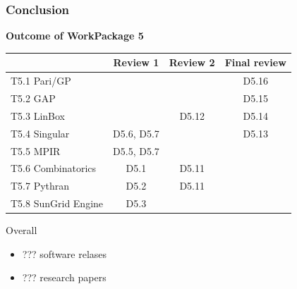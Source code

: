\documentclass{beamer}
\begin{document}

    


\begin{frame}
  \frametitle{Conclusion}

  \textbf{Outcome of WorkPackage 5}
  \begin{center}
{\small
    \begin{tabular}{lccc}
    \toprule
        & Review 1 & Review 2 & Final review\\
    \midrule
    T5.1 Pari/GP & & & {\color{darkgreen} D5.16} \\
    T5.2 GAP     & & & {\color{darkgreen} D5.15} \\
    T5.3 LinBox  & & {D5.12} & {\color{darkgreen} D5.14} \\
    T5.4 Singular& D5.6, D5.7 & & {\color{darkgreen} D5.13} \\
    T5.5 MPIR    & D5.5, D5.7& & \\
    T5.6 Combinatorics  & D5.1& {D5.11} & \\
    T5.7 Pythran        & D5.2 & {D5.11} & \\
    T5.8 SunGrid Engine & D5.3 & & \\
    \bottomrule
    
  \end{tabular}
}
  \end{center}
  
  Overall
  \begin{itemize}
  \item ??? software relases
  \item ??? research papers
  \end{itemize}
\end{frame}
  
\end{document}
